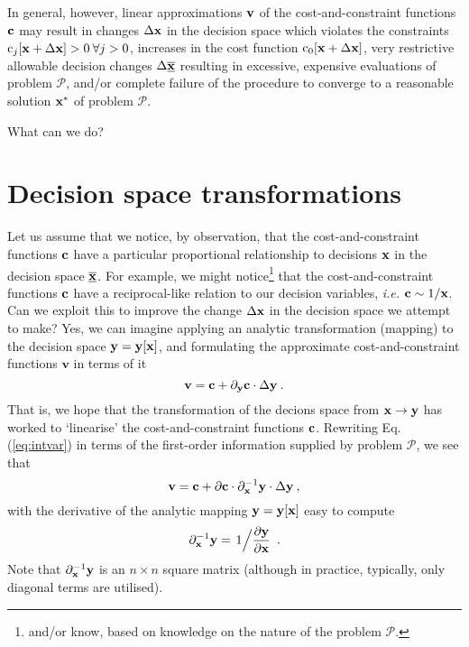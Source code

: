 \documentclass[11pt]{article}
\begin{document}
In general, however, linear approximations $\mathbf{v}$ of the cost-and-constraint functions $\mathbf{c}$ may result in changes $\Delta \mathbf{x}$ in the decision space which violates the constraints $\textrm{c}_j[\mathbf{x} + \Delta \mathbf{x}] > 0 \: \forall j > 0$, increases in the cost function $\textrm{c}_0[\mathbf{x} + \Delta \mathbf{x}]$, very restrictive allowable decision changes $\Delta \underline{\overline{\mathbf{x}}}$ resulting in excessive, expensive evaluations of problem $\mathcal{P}$, and/or complete failure of the procedure to converge to a reasonable solution $\mathbf{x}^\ast$ of problem $\mathcal{P}$.

What can we do?

\section{Decision space transformations}

Let us assume that we notice, by observation, that the cost-and-constraint functions $\mathbf{c}$ have a particular proportional relationship to decisions $\mathbf{x}$ in the decision space $\underline{\overline{\mathbf{x}}}$. For example, we might notice\footnote{and/or know, based on knowledge on the nature of the problem $\mathcal{P}$.} that the cost-and-constraint functions $\mathbf{c}$ have a reciprocal-like relation to our decision variables, \emph{i.e.} $\mathbf{c} \sim 1/\mathbf{x}$. Can we exploit this to improve the change $\Delta \mathbf{x}$ in the decision space we attempt to make? Yes, we can imagine applying an analytic transformation (mapping) to the decision space $\mathbf{y} = \mathbf{y}[\mathbf{x}]$, and formulating the approximate cost-and-constraint functions $\textbf{v}$ in terms of it
\begin{equation}
\label{eq:intvar}
    \textbf{v} = \mathbf{c} +   \partial_{\mathbf{y}} \mathbf{c} \cdot \Delta \mathbf{y} \:.
\end{equation}
That is, we hope that the transformation of the decions space from $\mathbf{x} \to \mathbf{y}$ has worked to `linearise' the cost-and-constraint functions $\mathbf{c}$. Rewriting Eq. (\ref{eq:intvar}) in terms of the first-order information supplied by problem $\mathcal{P}$, we see that
\begin{equation}
    \textbf{v} = \mathbf{c} + \partial \mathbf{c} \cdot \partial_{\mathbf{x}}^{-1} \mathbf{y} \cdot  \Delta \mathbf{y}    \:,
\end{equation}
with the derivative of the analytic mapping $\mathbf{y} = \mathbf{y}[\mathbf{x}]$ easy to compute
\begin{equation}
    \partial_{\mathbf{x}}^{-1} \mathbf{y} = \left. 1 \Big/ \frac{\partial \mathbf{y}}{\partial \mathbf{x}}\right. \: .
\end{equation}
Note that  $\partial_{\mathbf{x}}^{-1}\mathbf{y}$ is an $n \times n$ square matrix (although in practice, typically, only diagonal terms are utilised).
\end{document}
